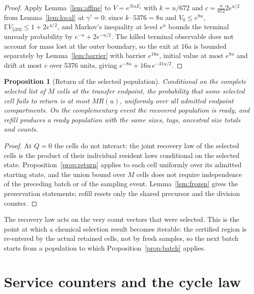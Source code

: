 \documentclass[11pt,a4paper]{article}
\theoremstyle{plain}
\newtheorem{proposition}[theorem]{Proposition}
\theoremstyle{definition}
\theoremstyle{remark}
\newcommand{\E}{\mathbb E}
\begin{document}
\begin{proof}
Apply Lemma~\ref{lem:affine} to $V=e^{N\alpha E_i}$ with $k=u/672$ and $c=\frac u{672}2e^{u/2}$ from Lemma~\ref{lem:local} at $\gamma'=0$: since $k\cdot5376=8u$ and $V_0\le e^{8u}$, $\E V_{5376}\le1+2e^{u/2}$, and Markov's inequality at level $e^u$ bounds the terminal unready probability by $e^{-u}+2e^{-u/2}$. The killed terminal observable does not account for mass lost at the outer boundary, so the exit at $16a$ is bounded separately by Lemma~\ref{lem:barrier} with barrier $e^{16u}$, initial value at most $e^{8u}$ and drift at most $c$ over $5376$ units, giving $e^{-8u}+16u\,e^{-31u/2}$.
\end{proof}

\begin{proposition}[Return of the selected population]\label{prop:population}
Conditional on the complete selected list of $M$ cells at the transfer endpoint, the probability that some selected cell fails to return is at most $MR(u)$, uniformly over all admitted endpoint compartments. On the complementary event the recovered population is ready, and refill produces a ready population with the same sizes, tags, ancestral size totals and counts.
\end{proposition}

\begin{proof}
At $Q=0$ the cells do not interact: the joint recovery law of the selected cells is the product of their individual resident laws conditional on the selected state. Proposition~\ref{prop:return} applies to each cell uniformly over its admitted starting state, and the union bound over $M$ cells does not require independence of the preceding batch or of the sampling event. Lemma~\ref{lem:frozen} gives the preservation statements; refill resets only the shared precursor and the division counter.
\end{proof}

The recovery law acts on the very count vectors that were selected. This is the point at which a chemical selection result becomes iterable: the certified region is re-entered by the actual retained cells, not by fresh samples, so the next batch starts from a population to which Proposition~\ref{prop:batch} applies.

\section{Service counters and the cycle law}\label{sec:service}
\end{document}
